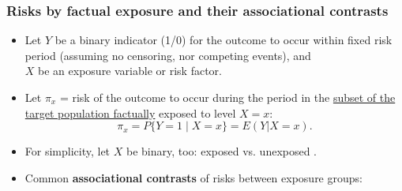 \documentclass[12pt,dvipsnames,t,aspectratio=169, handout%
]{beamer}
\begin{document}
\begin{frame}
\frametitle{\large Risks by factual exposure and their associational contrasts}
 
\begin{itemize}
\item
Let %
 $Y$ %
 be a binary indicator (1/0)
for the outcome to occur within fixed risk period (assuming no censoring, nor competing events), 
and \\ $X$ be an exposure variable or risk factor. 
\medskip
\item
Let $\pi_x$ = risk of the outcome to occur during the period in the
\underline{subset of the target population factually} exposed to level $X=x$:
$$ \pi_x = P \{ Y=1\mid X=x\} = E(Y|X=x) . $$
\item
For simplicity, let $X$ be binary, too: exposed vs. unexposed . %
\medskip
\item
Common \textbf{associational contrasts}
of risks  between exposure groups:
\medskip
{}
\end{itemize}
\end{frame}
\end{document}

